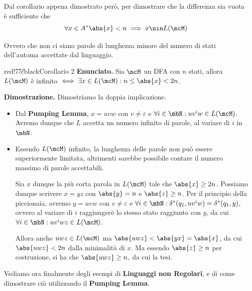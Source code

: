 Dal corollario appena dimostrato però, per dimostrare che la differenza sia vuota è sufficiente che
\begin{equation}
  \forall x \in A^* \abs{x} < n \implies x \nin L(\mcM)
\end{equation}

Ovvero che non ci siano parole di lunghezza minore del numero di stati dell'automa accettate dal linguaggio.

\newpage

\begin{halfframedbox}{red!75!black}{Corollario 2}
  \textbf{Enunciato. } Sia \(\mcM\) un DFA con \(n\) stati, allora \(L(\mcM)\) è infinito \(\iff \exists x \in L(\mcM): n \leq \abs{x} < 2n\).

  \begin{center}
    \textcolor{red!75!black}{\hdashrule[0.5ex]{18cm}{1pt}{3mm 3pt 1mm 2pt}}
  \end{center}

  \textbf{Dimostrazione. } Dimostriamo la doppia implicazione.

  \begin{itemize}
    \item [``\(\Rightarrow\)''] Dal \textbf{Pumping Lemma}, \(x=uvw\) con \(v \neq \varepsilon\) e \(\forall i \in \mbN: uv^{i}w \in L(\mcM)\). Avremo dunque che \(L\) accetta un numero infinito di parole, al variare di \(i\) in \(\mbN\).
    \item [``\(\Leftarrow\)''] Essendo \(L(\mcM)\) infinito, la lunghezza delle parole non può essere superiormente limitata, altrimenti sarebbe possibile contare il numero massimo di parole accettabili.

    Sia \(x\) dunque la più corta parola in \(L(\mcM)\) tale che \(\abs{x} \geq 2n\). Possiamo dunque scrivere \(x=yz\) con \(\abs{y}=n\) e \(\abs{z}\geq n\). Per il principio della piccionaia, avremo \(y=uvw\) con \(v \neq \varepsilon\) e \(\forall i \in \mbN: \delta^*(q_1,uv^{i}w)=\delta^*(q_1,y)\), ovvero al variare di \(i\) raggiungerò lo stesso stato raggiunto con \(y\), da cui \(\forall i \in \mbN: uv^{i}wz \in L(\mcM)\).

    Allora anche \(uwz \in L(\mcM)\) ma \(\abs{uwz} < \abs{yx}=\abs{x}\), da cui \(\abs{uwz} < 2n\) dalla minimalità di \(x\). Ma essendo \(\abs{z} \geq n\) per costruzione, si ha che \(\abs{uwz} \geq n\), da cui la tesi.
  \end{itemize}
\end{halfframedbox}

Vediamo ora finalmente degli esempi di \textbf{Linguaggi non Regolari}, e di come dimostrare ciò utilizzando il \textbf{Pumping Lemma}.

